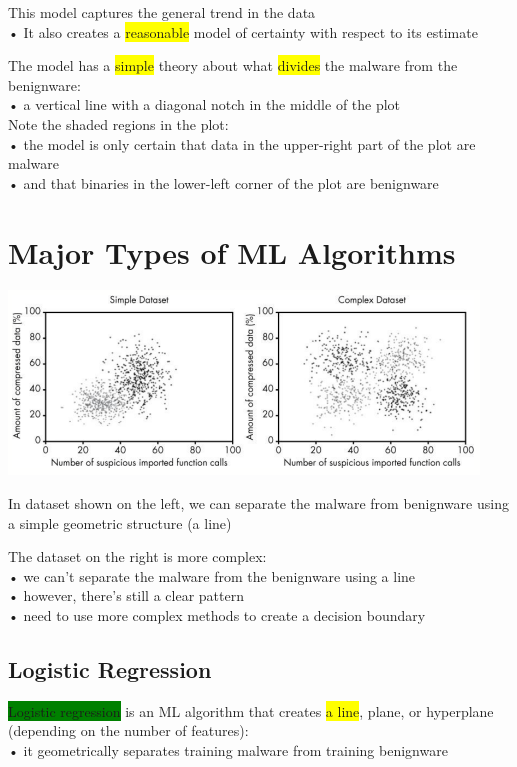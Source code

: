 \documentclass[]{project_plan}
\begin{document}
This model captures the general trend in the data\\
• It also creates a \colorbox{yellow}{reasonable} model of certainty with respect to its estimate

The model has a \colorbox{yellow}{simple} theory about what \colorbox{yellow}{divides} the malware from the
benignware:\\
• a vertical line with a diagonal notch in the middle of the plot\\

Note the shaded regions in the plot:\\
• the model is only certain that data in the upper-right part of the plot are malware\\
• and that binaries in the lower-left corner of the plot are benignware

\section{Major Types of ML Algorithms}

\includegraphics[width=.9\linewidth]{pg60ml.png}

In dataset shown on the left, we can separate the malware from benignware using a
simple geometric structure (a line)

The dataset on the right is more complex:\\
• we can’t separate the malware from the benignware using a line\\
• however, there’s still a clear pattern\\
• need to use more complex methods to create a decision boundary

\subsection{Logistic Regression}

\colorbox{green}{Logistic regression} is an ML algorithm that creates \colorbox{yellow}{a line}, plane, or hyperplane (depending on the
number of features):\\
• it geometrically separates training malware from training benignware
\end{document}
